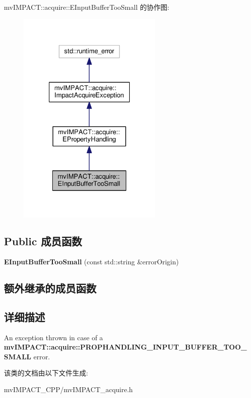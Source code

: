 mv\+I\+M\+P\+A\+C\+T\+:\+:acquire\+:\+:E\+Input\+Buffer\+Too\+Small 的协作图\+:
\nopagebreak
\begin{figure}[H]
\begin{center}
\leavevmode
\includegraphics[width=202pt]{classmv_i_m_p_a_c_t_1_1acquire_1_1_e_input_buffer_too_small__coll__graph}
\end{center}
\end{figure}
\subsection*{Public 成员函数}
\begin{DoxyCompactItemize}
\item 
\hypertarget{classmv_i_m_p_a_c_t_1_1acquire_1_1_e_input_buffer_too_small_af3770f95bc4cd8ff3c6f8574abacc9bc}{{\bfseries E\+Input\+Buffer\+Too\+Small} (const std\+::string \&error\+Origin)}\label{classmv_i_m_p_a_c_t_1_1acquire_1_1_e_input_buffer_too_small_af3770f95bc4cd8ff3c6f8574abacc9bc}

\end{DoxyCompactItemize}
\subsection*{额外继承的成员函数}


\subsection{详细描述}
An exception thrown in case of a {\bfseries mv\+I\+M\+P\+A\+C\+T\+::acquire\+::\+P\+R\+O\+P\+H\+A\+N\+D\+L\+I\+N\+G\+\_\+\+I\+N\+P\+U\+T\+\_\+\+B\+U\+F\+F\+E\+R\+\_\+\+T\+O\+O\+\_\+\+S\+M\+A\+L\+L} error. 

该类的文档由以下文件生成\+:\begin{DoxyCompactItemize}
\item 
mv\+I\+M\+P\+A\+C\+T\+\_\+\+C\+P\+P/mv\+I\+M\+P\+A\+C\+T\+\_\+acquire.\+h\end{DoxyCompactItemize}
